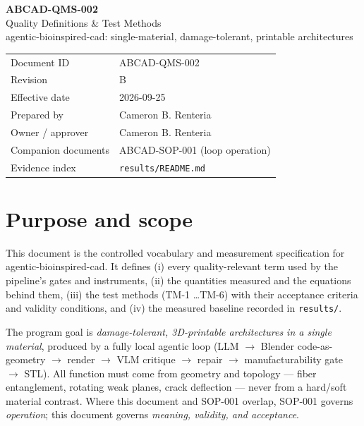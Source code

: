 \documentclass[11pt]{article}
\begin{document}
\sloppy
\setlength{\emergencystretch}{3em}

\begin{center}
{\LARGE\bfseries ABCAD-QMS-002}\\[0.4em]
{\Large Quality Definitions \& Test Methods}\\[0.3em]
{\large agentic-bioinspired-cad: single-material, damage-tolerant, printable architectures}\\[1.0em]
\begin{tabular}{ll}
\toprule
Document ID & ABCAD-QMS-002 \\
Revision & B \\
Effective date & 2026-09-25 \\
Prepared by & Cameron B. Renteria \\
Owner / approver & Cameron B. Renteria \\
Companion documents & ABCAD-SOP-001 (loop operation) \\
Evidence index & \texttt{results/README.md} \\
\bottomrule
\end{tabular}
\end{center}

\section{Purpose and scope}
This document is the controlled vocabulary and measurement specification for agentic-bioinspired-cad.
It defines (i) every quality-relevant term used by the pipeline's gates and instruments, (ii) the
quantities measured and the equations behind them, (iii) the test methods (TM-1 \ldots TM-6) with their
acceptance criteria and validity conditions, and (iv) the measured baseline recorded in
\texttt{results/}.

The program goal is \emph{damage-tolerant, 3D-printable architectures in a single material}, produced by a
fully local agentic loop (LLM $\rightarrow$ Blender code-as-geometry $\rightarrow$ render $\rightarrow$
VLM critique $\rightarrow$ repair $\rightarrow$ manufacturability gate $\rightarrow$ STL). All function
must come from geometry and topology --- fiber entanglement, rotating weak planes, crack deflection ---
never from a hard/soft material contrast. Where this document and SOP-001 overlap, SOP-001 governs
\emph{operation}; this document governs \emph{meaning, validity, and acceptance}.
\end{document}
